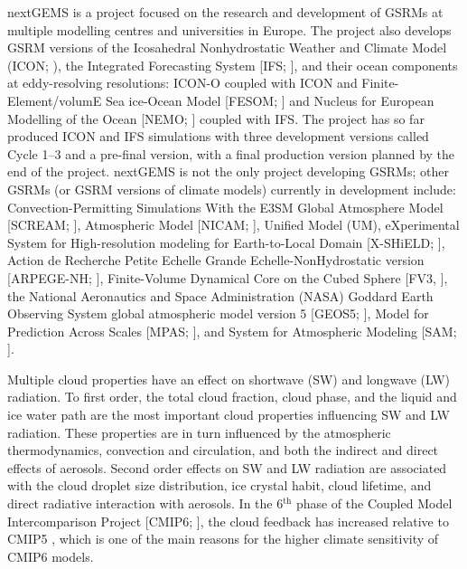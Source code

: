 \documentclass[12pt,a4paper]{article}
\begin{document}
nextGEMS is a project \citep{nextgems} focused on the research and development
of GSRMs at multiple modelling centres and universities in Europe.  The project
also develops GSRM versions of the Icosahedral Nonhydrostatic Weather and
Climate Model (ICON; \cite{hohenegger2023}), the Integrated Forecasting System
[IFS; \cite{ifs2023}], and their ocean components at eddy-resolving
resolutions: ICON-O \citep{korn2022} coupled with ICON and
Finite-Element/volumE Sea ice-Ocean Model [FESOM; \cite{wang2014}] and Nucleus
for European Modelling of the Ocean [NEMO; \cite{madec2023}] coupled with IFS.
The project has so far produced ICON and IFS simulations with three development
versions called Cycle 1--3 and a pre-final version, with a final production
version planned by the end of the project. nextGEMS is not the only project
developing GSRMs; other GSRMs (or GSRM versions of climate models) currently in
development include: Convection-Permitting Simulations With the E3SM Global
Atmosphere Model [SCREAM; \cite{caldwell2021}], Atmospheric Model [NICAM;
\cite{satoh2008}], Unified Model (UM), eXperimental System for High-resolution
modeling for Earth-to-Local Domain [X-SHiELD; \cite{shield}], Action de
Recherche Petite Echelle Grande Echelle-NonHydrostatic version [ARPEGE-NH;
\cite{bubnova1995,voldoire2017}], Finite-Volume Dynamical Core on the Cubed
Sphere [FV3, \cite{lin2004}], the National Aeronautics and Space Administration
(NASA) Goddard Earth Observing System global atmospheric model version 5
[GEOS5; \cite{putman2011}], Model for Prediction Across Scales [MPAS;
\cite{skamarock2012}], and System for Atmospheric Modeling [SAM;
\cite{khairoutdinov2003}].

Multiple cloud properties have an effect on shortwave (SW) and longwave (LW)
radiation. To first order, the total cloud fraction, cloud phase, and the
liquid and ice water path are the most important cloud properties influencing
SW and LW radiation. These properties are  in turn influenced by the
atmospheric thermodynamics, convection and circulation, and both the indirect
and direct effects of aerosols. Second order effects on SW and LW radiation are
associated with the cloud droplet size distribution, ice crystal habit, cloud
lifetime, and direct radiative interaction with aerosols.  In the
6$^\mathrm{th}$ phase of the Coupled Model Intercomparison Project [CMIP6;
\cite{eyring2016}], the cloud feedback has increased relative to CMIP5
\citep{zelinka2020}, which is one of the main reasons for the higher climate
sensitivity of CMIP6 models.
\end{document}
